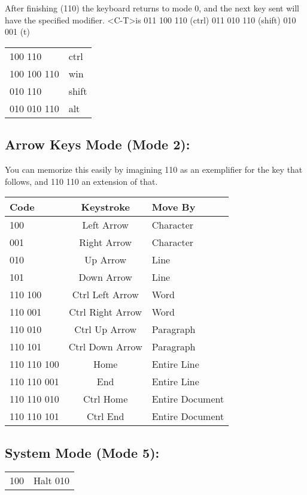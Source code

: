 \documentclass{book}
\begin{document}
After finishing (110) the keyboard returns to mode 0,
and the next key sent will have the specified modifier.
\textless C-T\textgreater is 011 100 110 (ctrl) 011 010 110 (shift) 010 001 (t)
\begin{center}
\begin{tabular} { l|l }
    100 \phantom{000}    110 & ctrl   \\
    100 100 110 & win    \\
    010 \phantom{000}    110 & shift  \\
    010 010 110 & alt
\end{tabular}
\end{center}


\subsection*{Arrow Keys Mode (Mode 2):}
You can memorize this easily by imagining 110 as an exemplifier for the key that follows, 
and 110 110 an extension of that.
\begin{center}
\begin{tabular} { l|c|l }
    Code & Keystroke & Move By \\
    \hline
    100 & Left Arrow & Character \\
    001 & Right Arrow & Character \\
    010 & Up Arrow & Line \\
    101 & Down Arrow & Line \\
    
    110 100 & Ctrl Left Arrow & Word \\
    110 001 & Ctrl Right Arrow & Word \\
    110 010 & Ctrl Up Arrow & Paragraph \\
    110 101 & Ctrl Down Arrow & Paragraph \\

    110 110 100 & Home & Entire Line \\
    110 110 001 & End & Entire Line \\
    110 110 010 & Ctrl Home & Entire Document \\
    110 110 101 & Ctrl End & Entire Document \\

    
\end{tabular}
\end{center}    

\subsection*{System Mode (Mode 5):}

\begin{center}
\begin{tabular} { l|l }
    100 & Halt
    010 & 
\end{tabular}
\end{center}
\end{document}
